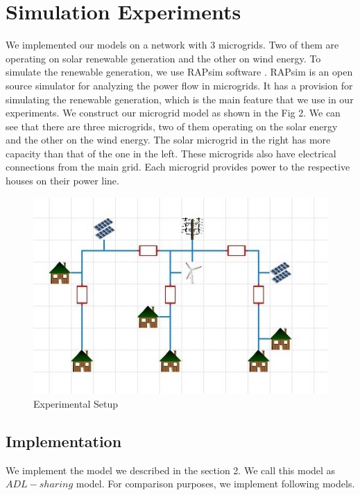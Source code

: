 \section{Simulation Experiments}
We implemented our models on a network with 3 microgrids. Two of them are operating on solar renewable generation and the other on wind energy. To simulate the renewable generation, we use RAPsim software \cite{rapsim}. RAPsim is an open source simulator for analyzing the power flow in microgrids. It has a provision for simulating the renewable generation, which is the main feature that we use in our experiments. We construct our microgrid model as shown in the Fig 2. We can see that there are three microgrids, two of them operating on the solar energy and the other on the wind energy. The solar microgrid in the right has more capacity than that of the one in the left. These microgrids also have electrical connections from the main grid. Each microgrid provides power to the respective houses on their power line. 


\begin{figure}[thbp] \label{exp}
	\centering
	\includegraphics[scale = 0.6]{experimental_setup.jpg}
		\caption{Experimental Setup}
\end{figure}


\subsection{Implementation}

We implement the model we described in the section 2. We call this model as $ADL-sharing$ model. For comparison purposes, we implement following models. 

